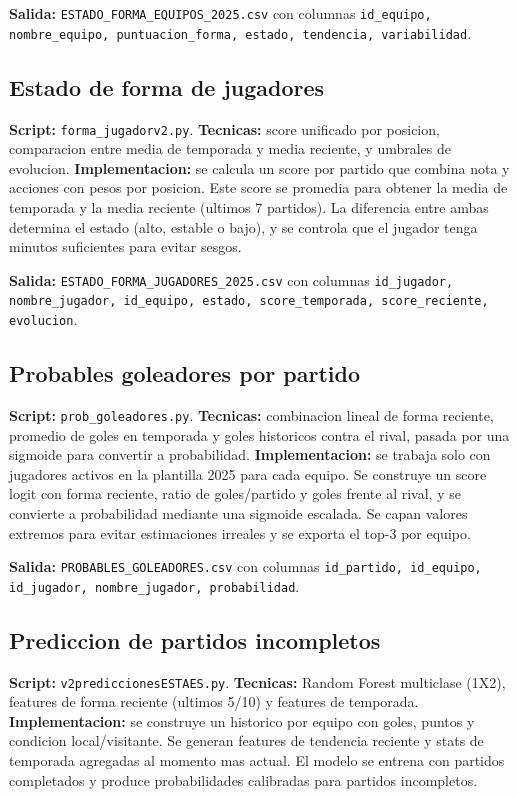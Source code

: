 \textbf{Salida:} \texttt{ESTADO\_FORMA\_EQUIPOS\_2025.csv} con columnas \texttt{id\_equipo, nombre\_equipo, puntuacion\_forma, estado, tendencia, variabilidad}.

\subsection{Estado de forma de jugadores}
\textbf{Script:} \texttt{forma\_jugadorv2.py}.\newline
\textbf{Tecnicas:} score unificado por posicion, comparacion entre media de temporada y media reciente, y umbrales de evolucion.\newline
\textbf{Implementacion:} se calcula un score por partido que combina nota y acciones con pesos por posicion. Este score se promedia para obtener la media de temporada y la media reciente (ultimos 7 partidos). La diferencia entre ambas determina el estado (alto, estable o bajo), y se controla que el jugador tenga minutos suficientes para evitar sesgos.

\textbf{Salida:} \texttt{ESTADO\_FORMA\_JUGADORES\_2025.csv} con columnas \texttt{id\_jugador, nombre\_jugador, id\_equipo, estado, score\_temporada, score\_reciente, evolucion}.

\subsection{Probables goleadores por partido}
\textbf{Script:} \texttt{prob\_goleadores.py}.\newline
\textbf{Tecnicas:} combinacion lineal de forma reciente, promedio de goles en temporada y goles historicos contra el rival, pasada por una sigmoide para convertir a probabilidad.\newline
\textbf{Implementacion:} se trabaja solo con jugadores activos en la plantilla 2025 para cada equipo. Se construye un score logit con forma reciente, ratio de goles/partido y goles frente al rival, y se convierte a probabilidad mediante una sigmoide escalada. Se capan valores extremos para evitar estimaciones irreales y se exporta el top-3 por equipo.

\textbf{Salida:} \texttt{PROBABLES\_GOLEADORES.csv} con columnas \texttt{id\_partido, id\_equipo, id\_jugador, nombre\_jugador, probabilidad}.

\subsection{Prediccion de partidos incompletos}
\textbf{Script:} \texttt{v2prediccionesESTAES.py}.\newline
\textbf{Tecnicas:} Random Forest multiclase (1X2), features de forma reciente (ultimos 5/10) y features de temporada.\newline
\textbf{Implementacion:} se construye un historico por equipo con goles, puntos y condicion local/visitante. Se generan features de tendencia reciente y stats de temporada agregadas al momento mas actual. El modelo se entrena con partidos completados y produce probabilidades calibradas para partidos incompletos.


